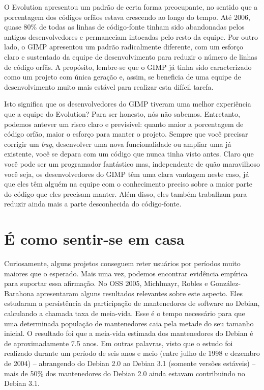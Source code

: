 O Evolution apresentou um padrão de certa forma preocupante, no sentido que a porcentagem
dos códigos orfãos estava crescendo ao longo do tempo. Até 2006, quase 80\% de todas as
linhas de código-fonte tinham sido abandonadas pelos antigos desenvolvedores e permaneciam
intocadas pelo resto da equipe. Por outro lado, o GIMP apresentou um padrão radicalmente
diferente, com um esforço claro e sustentado da equipe de desenvolvimento para reduzir o
número de linhas de código orfãs. A propósito, lembre-se que o GIMP já tinha sido caracterizado
como um projeto com única geração e, assim, se beneficia de uma equipe de desenvolvimento
muito mais estável para realizar esta difícil tarefa.

Isto significa que os desenvolvedores do GIMP tiveram uma melhor experiência que
a equipe do Evolution? Para ser honesto, nós não sabemos. Entretanto, podemos antever um
risco claro e previsível: quanto maior a porcentagem de código orfão, maior o esforço para
manter o projeto. Sempre que você precisar corrigir um \textit {bug}, desenvolver uma
nova funcionalidade ou ampliar uma já existente, você se depara com um código que nunca tinha
visto antes. Claro que você pode ser um programador fantástico mas, independente de quão maravilhoso
você seja, os desenvolvedores do GIMP têm uma clara vantagem neste caso, já que eles têm alguém
na equipe com o conhecimento preciso sobre a maior parte do código que eles precisam manter.
Além disso, eles também trabalham para reduzir ainda mais a parte desconhecida do código-fonte.

\section*{É como sentir-se em casa}

Curiosamente, alguns projetos conseguem reter usuários por períodos muito maiores
que o esperado. Mais uma vez, podemos encontrar evidência empírica para suportar essa 
afirmação. No OSS 2005, Michlmayr, Robles e González-Barahona apresentaram alguns
resultados relevantes sobre este aspecto. Eles estudaram a persistência da participação
de mantenedores de software no Debian, calculando a chamada taxa de meia-vida. 
Esse é o tempo necessário para que uma determinada população de mantenedores caia pela
metade do seu tamanho inicial. O resultado foi que a meia-vida estimada dos mantenedores
do Debian é de aproximadamente 7.5 anos. Em outras palavras, visto que o estudo
foi realizado durante um período de seis anos e meio (entre julho de 1998 e
dezembro de 2004) -- abrangendo do Debian 2.0 ao Debian 3.1 (somente versões estáveis) -- 
mais de 50\% dos mantenedores do Debian 2.0 ainda estavam contribuindo no Debian
3.1.

